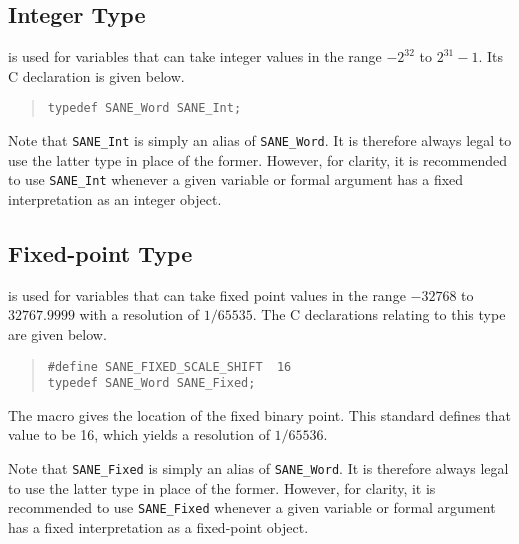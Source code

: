 \documentclass[11pt,DVIps]{report}
\begin{document}
\subsection{Integer Type}

 is used for variables that can take integer
values in the range $-2^{32}$ to $2^{31}-1$.  Its C declaration is
given below.
\begin{quote}
\begin{verbatim}
typedef SANE_Word SANE_Int;
\end{verbatim}
\end{quote}
Note that \verb|SANE_Int| is simply an alias of \verb|SANE_Word|.  It
is therefore always legal to use the latter type in place of the
former.  However, for clarity, it is recommended to use
\verb|SANE_Int| whenever a given variable or formal argument has a
fixed interpretation as an integer object.


\subsection{Fixed-point Type}

 is used for variables that can take fixed
point values in the range $-32768$ to $32767.9999$ with a resolution
of $1/65535$.  The C declarations relating to this type are given
below.
\begin{quote}
\begin{verbatim}
#define SANE_FIXED_SCALE_SHIFT  16
typedef SANE_Word SANE_Fixed;
\end{verbatim}
\end{quote}
The macro  gives the location
of the fixed binary point.  This standard defines that value to be 16,
which yields a resolution of $1/65536$.

Note that \verb|SANE_Fixed| is simply an alias of \verb|SANE_Word|.
It is therefore always legal to use the latter type in place of the
former.  However, for clarity, it is recommended to use
\verb|SANE_Fixed| whenever a given variable or formal argument has a
fixed interpretation as a fixed-point object.
\end{document}
